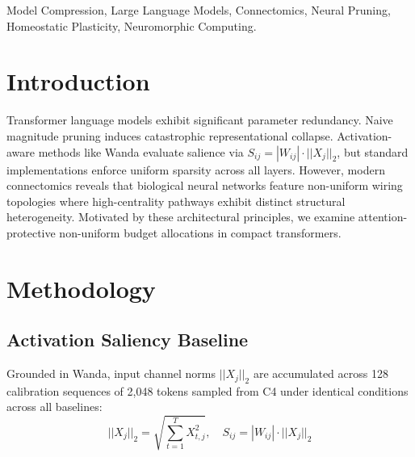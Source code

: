 \documentclass[conference]{IEEEtran}
\begin{document}
\begin{IEEEkeywords}
Model Compression, Large Language Models, Connectomics, Neural Pruning, Homeostatic Plasticity, Neuromorphic Computing.
\end{IEEEkeywords}

\section{Introduction}
Transformer language models exhibit significant parameter redundancy. Naive magnitude pruning induces catastrophic representational collapse. Activation-aware methods like Wanda evaluate salience via $S_{ij} = |W_{ij}| \cdot ||X_j||_2$, but standard implementations enforce uniform sparsity across all layers. However, modern connectomics reveals that biological neural networks feature non-uniform wiring topologies where high-centrality pathways exhibit distinct structural heterogeneity. Motivated by these architectural principles, we examine attention-protective non-uniform budget allocations in compact transformers.

\section{Methodology}

\subsection{Activation Saliency Baseline}
Grounded in Wanda, input channel norms $||X_j||_2$ are accumulated across 128 calibration sequences of 2,048 tokens sampled from C4 under identical conditions across all baselines:
\begin{equation}
||X_j||_2 = \sqrt{\sum_{t=1}^{T} X_{t,j}^2}, \quad S_{ij} = |W_{ij}| \cdot ||X_j||_2
\end{equation}
\end{document}
